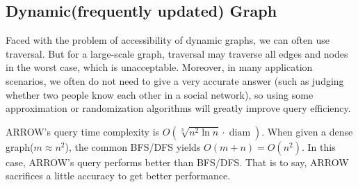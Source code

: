 \documentclass[11pt]{article}
\begin{document}
\subsection{Dynamic(frequently updated) Graph}
Faced with the problem of accessibility of dynamic graphs, we can often use traversal.  But for a large-scale graph, traversal may traverse all edges and nodes in the worst case, which is unacceptable.  Moreover, in many application scenarios, we often do not need to give a very accurate answer (such as judging whether two people know each other in a social network), so using some approximation or randomization algorithms will greatly improve query efficiency.

ARROW's query time complexity is $O\left(\sqrt[3]{n^{2} \ln n} \cdot \operatorname{diam}\right)$. When given a dense graph($m\approx n^2$), the common BFS/DFS yields $O(m+n)=O(n^2)$. In this case, ARROW's query performs better than BFS/DFS. That is to say, ARROW sacrifices a little accuracy to get better performance. 
\end{document}
